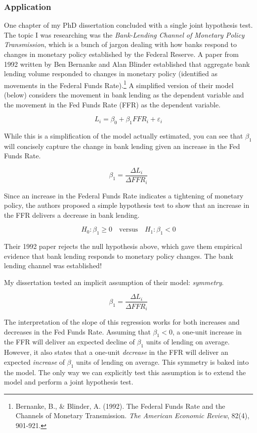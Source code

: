 \documentclass[
]{book}
\begin{document}
\hypertarget{application}{%
\subsubsection*{Application}\label{application}}

One chapter of my PhD dissertation concluded with a single joint hypothesis test. The topic I was researching was the \emph{Bank-Lending Channel of Monetary Policy Transmission}, which is a bunch of jargon dealing with how banks respond to changes in monetary policy established by the Federal Reserve. A paper from 1992 written by Ben Bernanke and Alan Blinder established that aggregate bank lending volume responded to changes in monetary policy (identified as movements in the Federal Funds Rate).\footnote{Bernanke, B., \& Blinder, A. (1992). The Federal Funds Rate and the Channels of Monetary Transmission. \emph{The American Economic Review}, 82(4), 901-921.} A simplified version of their model (below) considers the movement in bank lending as the dependent variable and the movement in the Fed Funds Rate (FFR) as the dependent variable.

\[L_i = \beta_0 + \beta_1 FFR_i + \varepsilon_i\]

While this is a simplification of the model actually estimated, you can see that \(\beta_1\) will concisely capture the change in bank lending given an increase in the Fed Funds Rate.

\[\beta_1 = \frac{\Delta L_i}{\Delta FFR_i}\]

Since an increase in the Federal Funds Rate indicates a tightening of monetary policy, the authors proposed a simple hypothesis test to show that an increase in the FFR delivers a decrease in bank lending.

\[H_0:\beta_1 \geq 0 \quad \text{versus} \quad H_1:\beta_1 < 0\]

Their 1992 paper rejects the null hypothesis above, which gave them empirical evidence that bank lending responds to monetary policy changes. The bank lending channel was established!

My dissertation tested an implicit assumption of their model: \emph{symmetry}.

\[\beta_1 = \frac{\Delta L_i}{\Delta FFR_i}\]

The interpretation of the slope of this regression works for both increases and decreases in the Fed Funds Rate. Assuming that \(\beta_1 <0\), a one-unit increase in the FFR will deliver an expected decline of \(\beta_1\) units of lending on average. However, it also states that a one-unit \emph{decrease} in the FFR will deliver an expected \emph{increase} of \(\beta_1\) units of lending on average. This symmetry is baked into the model. The only way we can explicitly test this assumption is to extend the model and perform a joint hypothesis test.
\end{document}

